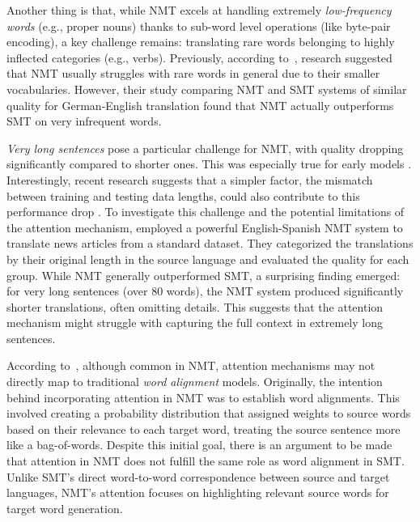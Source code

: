 {{Another thing is that, while NMT excels at handling extremely \textit{low-frequency words} (e.g., proper nouns) thanks to sub-word level operations (like byte-pair encoding), a key challenge remains: translating rare words belonging to highly inflected categories (e.g., verbs). Previously, according to~\textcite{koehn-knowles-2017-six}, research suggested that NMT usually struggles with rare words in general \parencite{LuongPM15, sennrich-etal-2016-neural} due to their smaller vocabularies. However, their study comparing NMT and SMT systems of similar quality for German-English translation found that NMT actually outperforms SMT on very infrequent words.

\textit{Very long sentences} pose a particular challenge for NMT, with quality dropping significantly compared to shorter ones. This was especially true for early models \parencite{cho2014properties, pouget2014overcoming}. Interestingly, recent research suggests that a simpler factor, the mismatch between training and testing data lengths, could also contribute to this performance drop \parencite{varis-bojar-2021}. To investigate this challenge and the potential limitations of the attention mechanism, \textcite{koehn-knowles-2017-six} employed a powerful English-Spanish NMT system to translate news articles from a standard dataset. They categorized the translations by their original length in the source language and evaluated the quality for each group. While NMT generally outperformed SMT, a surprising finding emerged: for very long sentences (over 80 words), the NMT system produced significantly shorter translations, often omitting details. This suggests that the attention mechanism might struggle with capturing the full context in extremely long sentences.

According to~\textcite{koehn-knowles-2017-six}, although common in NMT, attention mechanisms may not directly map to traditional \textit{word alignment} models. Originally, the intention behind incorporating attention in NMT was to establish word alignments. This involved creating a probability distribution that assigned weights to source words based on their relevance to each target word, treating the source sentence more like a bag-of-words. Despite this initial goal, there is an argument to be made that attention in NMT does not fulfill the same role as word alignment in SMT. Unlike SMT's direct word-to-word correspondence between source and target languages, NMT's attention focuses on highlighting relevant source words for target word generation.

}}
